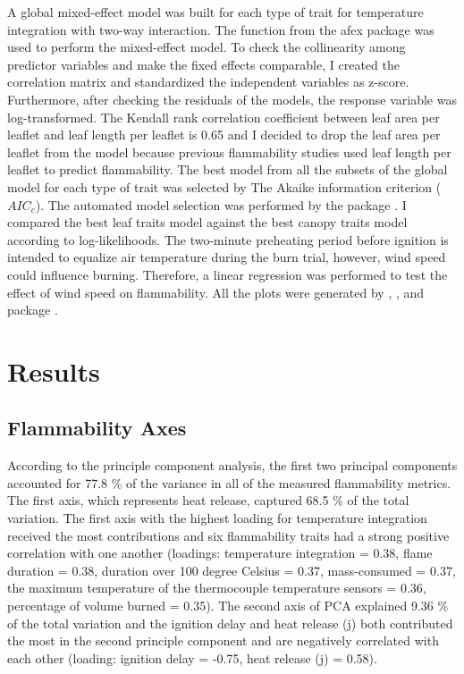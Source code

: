 \documentclass[12pt]{report}
\begin{document}
A global mixed-effect model was built for each type of trait for temperature integration with two-way interaction. The  function from the afex package \citep{singmann2015packageafex,afexluke2017evaluating} was used to perform the mixed-effect model. To check the collinearity among predictor variables and make the fixed effects comparable, I created the correlation matrix and standardized the independent variables as z-score. Furthermore, after checking the residuals of the models, the response variable was log-transformed. The Kendall rank correlation coefficient between leaf area per leaflet and leaf length per leaflet is 0.65 and I decided to drop the leaf area per leaflet from the model because previous flammability studies used leaf length per leaflet to predict flammability. The best model from all the subsets of the global model for each type of trait was selected by The Akaike information criterion ($AIC_{c}$). The automated model selection was performed by the  package \citep{barton2015packagemumin}. I compared the best leaf traits model against the best canopy traits model according to log-likelihoods. The two-minute preheating period before ignition is intended to equalize air temperature during the burn trial, however, wind speed could influence burning. Therefore, a linear regression was performed to test the effect of wind speed on flammability. All the plots were generated by , , and  package \citep{wickham2016packageggplot2, kassambara2017packagefactoextra,kassambara2020package}.\\





\section{Results}

\subsection{Flammability Axes}
According to the principle component analysis, the first two principal components accounted for 77.8 \% of   the variance in all of the measured flammability metrics. The first axis, which represents heat release, captured 68.5 \% of the total variation. The first axis with the highest loading for temperature integration received the most contributions and six flammability traits had a strong positive correlation with one another (loadings: temperature integration = 0.38, flame duration = 0.38, duration over 100 degree Celsius = 0.37, mass-consumed = 0.37, the maximum temperature of the thermocouple temperature sensors = 0.36, percentage of volume burned = 0.35). The second axis of PCA explained 9.36 \% of the total variation and the ignition delay and heat release (j) both contributed the most in the second principle component and are negatively correlated with each other (loading: ignition delay = -0.75, heat release (j) = 0.58).
\end{document}

